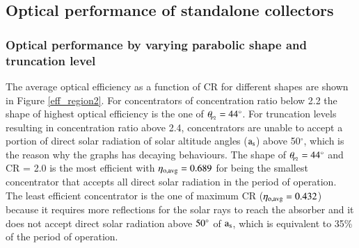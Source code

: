 


\subsection{Optical performance of standalone collectors}

\subsubsection{Optical performance by varying parabolic shape and truncation level}

The average optical efficiency as a function of CR for different shapes are shown in Figure \ref{eff_region2}. For concentrators of concentration ratio below 2.2 the shape of highest optical efficiency is the one of $\theta_{\!_{\rm{P2}}} = 44^{\circ}$. For truncation levels resulting in concentration ratio above 2.4, concentrators are unable to accept a portion of direct solar radiation of solar altitude angles ($\rm{a_s}$) above 50$^{\circ}$, which is the reason why the graphs has decaying behaviours. The shape of $\theta_{\!_{\rm{P2}}} = 44^{\circ}$ and CR = 2.0 is the most efficient with $\rm{\eta_{o,avg} = 0.689}$ for being the smallest concentrator that accepts all direct solar radiation in the period of operation. The least efficient concentrator is the one of maximum CR ($\rm{\eta_{o,avg} = 0.432}$) because it requires more reflections for the solar rays to reach the absorber and it does not accept direct solar radiation above $\rm{50^{\circ}}$ of $\rm{a_s}$, which is equivalent to 35\% of the period of operation.


